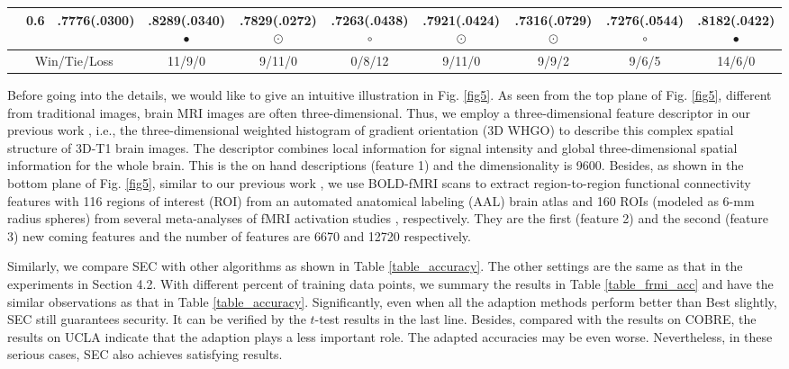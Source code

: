 \documentclass[10pt,journal,compsoc]{IEEEtran}
\begin{document}
\begin{table*}[!t]
{\begin{tabular}{c||c|| c c c c c c c c }
      &0.6 &.7776(.0300) & .8289(.0340)$\bullet$ & .7829(.0272){\tiny $\odot$} & .7263(.0438)$\circ$  & .7921(.0424){\tiny $\odot$} & .7316(.0729){\tiny $\odot$} & .7276(.0544)$\circ$  & .8182(.0422)$\bullet$ \\
\hline
\multicolumn{3}{c}{Win/Tie/Loss}&    11/9/0  & 9/11/0 & 0/8/12 & 9/11/0 & 9/9/2 & 9/6/5 & 14/6/0  \\
\hline
\end{tabular}}
\vskip -0.0in
\end{table*}

Before going into the details, we would like to give an intuitive illustration in Fig. \ref{fig5}. As seen from the top plane of Fig. \ref{fig5}, different from traditional images, brain MRI images are often three-dimensional. Thus, we employ a three-dimensional feature descriptor in our previous work \cite{Yuan2015Gender}, i.e., the three-dimensional weighted histogram of gradient orientation (3D WHGO) to describe this complex spatial structure of 3D-T1 brain images.  The descriptor combines local information for signal intensity and global three-dimensional spatial information for the whole brain. This is the on hand descriptions (feature 1) and the dimensionality is 9600. Besides, as shown in the bottom plane of Fig. \ref{fig5}, similar to our previous work \cite{brain/zeng}, we use BOLD-fMRI scans to extract region-to-region functional connectivity features with 116 regions of interest (ROI) from an automated anatomical labeling (AAL) brain atlas \cite{TZOURIOMAZOYER2002273} and 160 ROIs (modeled as 6-mm radius spheres) from several meta-analyses of fMRI activation studies \cite{Dosenbach2010Prediction}, respectively. They are the first (feature 2) and the second (feature 3) new coming features and the number of features are 6670 and 12720 respectively.

Similarly, we compare SEC with other algorithms as shown in Table \ref{table_accuracy}. The other settings are the same as that in the experiments in Section 4.2. With different percent of training data points, we summary the results in Table \ref{table_frmi_acc} and have the similar observations as that in Table \ref{table_accuracy}. Significantly, even when all the adaption methods perform better than Best slightly, SEC still guarantees security. It can be verified by the $t$-test results in the last line. Besides, compared with the results on COBRE, the results on UCLA indicate that the adaption plays a less important role. The adapted accuracies may be even worse. Nevertheless, in these serious cases, SEC also achieves satisfying results.
\end{document}
